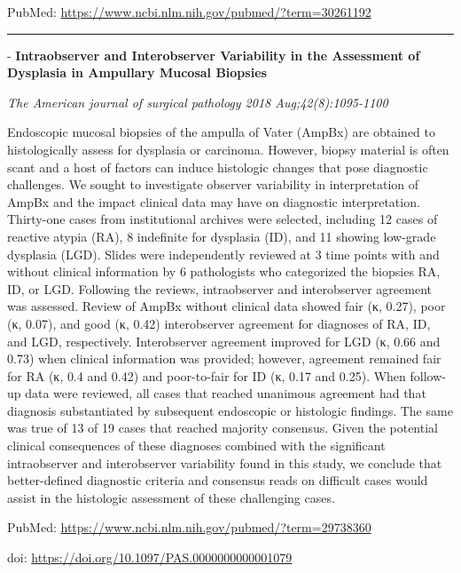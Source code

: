 \documentclass[]{article}
\begin{document}
PubMed: \url{https://www.ncbi.nlm.nih.gov/pubmed/?term=30261192}

{}

{}

\begin{center}\rule{0.5\linewidth}{\linethickness}\end{center}

 - \textbf{Intraobserver and Interobserver Variability in the Assessment
of Dysplasia in Ampullary Mucosal Biopsies}

\emph{The American journal of surgical pathology 2018
Aug;42(8):1095-1100}

Endoscopic mucosal biopsies of the ampulla of Vater (AmpBx) are obtained
to histologically assess for dysplasia or carcinoma. However, biopsy
material is often scant and a host of factors can induce histologic
changes that pose diagnostic challenges. We sought to investigate
observer variability in interpretation of AmpBx and the impact clinical
data may have on diagnostic interpretation. Thirty-one cases from
institutional archives were selected, including 12 cases of reactive
atypia (RA), 8 indefinite for dysplasia (ID), and 11 showing low-grade
dysplasia (LGD). Slides were independently reviewed at 3 time points
with and without clinical information by 6 pathologists who categorized
the biopsies RA, ID, or LGD. Following the reviews, intraobserver and
interobserver agreement was assessed. Review of AmpBx without clinical
data showed fair (κ, 0.27), poor (κ, 0.07), and good (κ, 0.42)
interobserver agreement for diagnoses of RA, ID, and LGD, respectively.
Interobserver agreement improved for LGD (κ, 0.66 and 0.73) when
clinical information was provided; however, agreement remained fair for
RA (κ, 0.4 and 0.42) and poor-to-fair for ID (κ, 0.17 and 0.25). When
follow-up data were reviewed, all cases that reached unanimous agreement
had that diagnosis substantiated by subsequent endoscopic or histologic
findings. The same was true of 13 of 19 cases that reached majority
consensus. Given the potential clinical consequences of these diagnoses
combined with the significant intraobserver and interobserver
variability found in this study, we conclude that better-defined
diagnostic criteria and consensus reads on difficult cases would assist
in the histologic assessment of these challenging cases.

PubMed: \url{https://www.ncbi.nlm.nih.gov/pubmed/?term=29738360}

doi: \url{https://doi.org/10.1097/PAS.0000000000001079}
\end{document}
